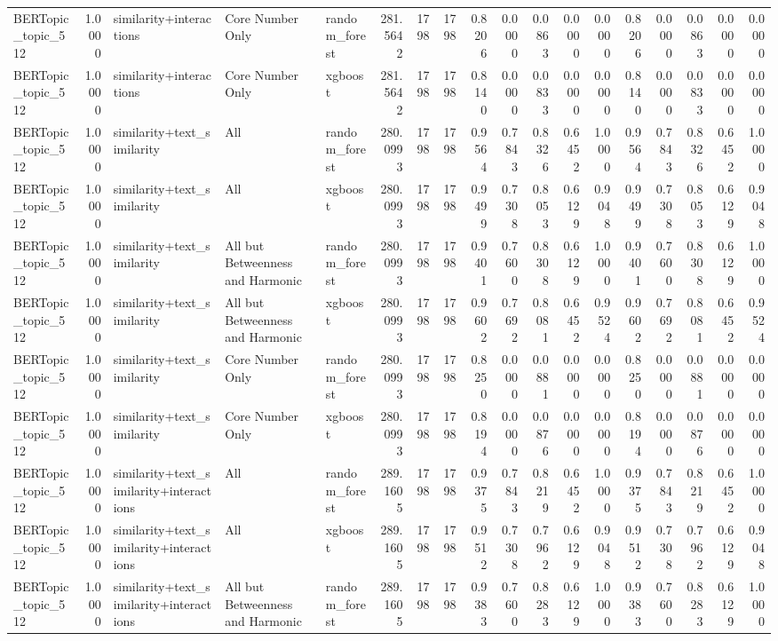 \begin{tabular}{lrlllrrrrrrrrrrrrr}
BERTopic_topic_512 & 1.0000 & similarity+interactions & Core Number Only & random_forest & 281.5642 & 1798 & 1798 & 0.8206 & 0.0000 & 0.0863 & 0.0000 & 0.0000 & 0.8206 & 0.0000 & 0.0863 & 0.0000 & 0.0000 \\
BERTopic_topic_512 & 1.0000 & similarity+interactions & Core Number Only & xgboost & 281.5642 & 1798 & 1798 & 0.8140 & 0.0000 & 0.0833 & 0.0000 & 0.0000 & 0.8140 & 0.0000 & 0.0833 & 0.0000 & 0.0000 \\
BERTopic_topic_512 & 1.0000 & similarity+text_similarity & All & random_forest & 280.0993 & 1798 & 1798 & 0.9564 & 0.7843 & 0.8326 & 0.6452 & 1.0000 & 0.9564 & 0.7843 & 0.8326 & 0.6452 & 1.0000 \\
BERTopic_topic_512 & 1.0000 & similarity+text_similarity & All & xgboost & 280.0993 & 1798 & 1798 & 0.9499 & 0.7308 & 0.8053 & 0.6129 & 0.9048 & 0.9499 & 0.7308 & 0.8053 & 0.6129 & 0.9048 \\
BERTopic_topic_512 & 1.0000 & similarity+text_similarity & All but Betweenness and Harmonic & random_forest & 280.0993 & 1798 & 1798 & 0.9401 & 0.7600 & 0.8308 & 0.6129 & 1.0000 & 0.9401 & 0.7600 & 0.8308 & 0.6129 & 1.0000 \\
BERTopic_topic_512 & 1.0000 & similarity+text_similarity & All but Betweenness and Harmonic & xgboost & 280.0993 & 1798 & 1798 & 0.9602 & 0.7692 & 0.8081 & 0.6452 & 0.9524 & 0.9602 & 0.7692 & 0.8081 & 0.6452 & 0.9524 \\
BERTopic_topic_512 & 1.0000 & similarity+text_similarity & Core Number Only & random_forest & 280.0993 & 1798 & 1798 & 0.8250 & 0.0000 & 0.0881 & 0.0000 & 0.0000 & 0.8250 & 0.0000 & 0.0881 & 0.0000 & 0.0000 \\
BERTopic_topic_512 & 1.0000 & similarity+text_similarity & Core Number Only & xgboost & 280.0993 & 1798 & 1798 & 0.8194 & 0.0000 & 0.0876 & 0.0000 & 0.0000 & 0.8194 & 0.0000 & 0.0876 & 0.0000 & 0.0000 \\
BERTopic_topic_512 & 1.0000 & similarity+text_similarity+interactions & All & random_forest & 289.1605 & 1798 & 1798 & 0.9375 & 0.7843 & 0.8219 & 0.6452 & 1.0000 & 0.9375 & 0.7843 & 0.8219 & 0.6452 & 1.0000 \\
BERTopic_topic_512 & 1.0000 & similarity+text_similarity+interactions & All & xgboost & 289.1605 & 1798 & 1798 & 0.9512 & 0.7308 & 0.7962 & 0.6129 & 0.9048 & 0.9512 & 0.7308 & 0.7962 & 0.6129 & 0.9048 \\
BERTopic_topic_512 & 1.0000 & similarity+text_similarity+interactions & All but Betweenness and Harmonic & random_forest & 289.1605 & 1798 & 1798 & 0.9383 & 0.7600 & 0.8283 & 0.6129 & 1.0000 & 0.9383 & 0.7600 & 0.8283 & 0.6129 & 1.0000 \\

\end{tabular}
